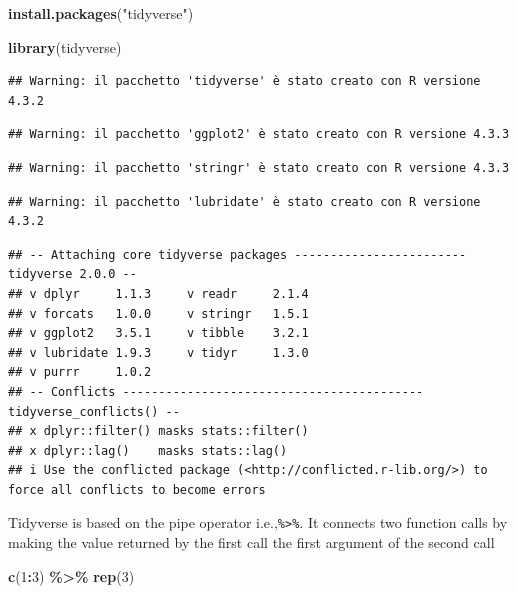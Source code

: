 \documentclass[
]{article}
\newenvironment{Shaded}{\begin{snugshade}}{\end{snugshade}}
\newcommand{\DecValTok}[1]{\textcolor[rgb]{0.00,0.00,0.81}{#1}}
\newcommand{\FunctionTok}[1]{\textcolor[rgb]{0.13,0.29,0.53}{\textbf{#1}}}
\newcommand{\NormalTok}[1]{#1}
\newcommand{\SpecialCharTok}[1]{\textcolor[rgb]{0.81,0.36,0.00}{\textbf{#1}}}
\newcommand{\StringTok}[1]{\textcolor[rgb]{0.31,0.60,0.02}{#1}}
\begin{document}
\begin{Shaded}
\begin{Highlighting}[]
\FunctionTok{install.packages}\NormalTok{(}\StringTok{"tidyverse"}\NormalTok{)}
\end{Highlighting}
\end{Shaded}

\begin{Shaded}
\begin{Highlighting}[]
\FunctionTok{library}\NormalTok{(tidyverse)}
\end{Highlighting}
\end{Shaded}

\begin{verbatim}
## Warning: il pacchetto 'tidyverse' è stato creato con R versione 4.3.2
\end{verbatim}

\begin{verbatim}
## Warning: il pacchetto 'ggplot2' è stato creato con R versione 4.3.3
\end{verbatim}

\begin{verbatim}
## Warning: il pacchetto 'stringr' è stato creato con R versione 4.3.3
\end{verbatim}

\begin{verbatim}
## Warning: il pacchetto 'lubridate' è stato creato con R versione 4.3.2
\end{verbatim}

\begin{verbatim}
## -- Attaching core tidyverse packages ------------------------ tidyverse 2.0.0 --
## v dplyr     1.1.3     v readr     2.1.4
## v forcats   1.0.0     v stringr   1.5.1
## v ggplot2   3.5.1     v tibble    3.2.1
## v lubridate 1.9.3     v tidyr     1.3.0
## v purrr     1.0.2     
## -- Conflicts ------------------------------------------ tidyverse_conflicts() --
## x dplyr::filter() masks stats::filter()
## x dplyr::lag()    masks stats::lag()
## i Use the conflicted package (<http://conflicted.r-lib.org/>) to force all conflicts to become errors
\end{verbatim}

Tidyverse is based on the pipe operator
i.e.,\texttt{\%\textgreater{}\%}. It connects two function calls by
making the value returned by the first call the first argument of the
second call

\begin{Shaded}
\begin{Highlighting}[]
\FunctionTok{c}\NormalTok{(}\DecValTok{1}\SpecialCharTok{:}\DecValTok{3}\NormalTok{) }\SpecialCharTok{\%\textgreater{}\%} \FunctionTok{rep}\NormalTok{(}\DecValTok{3}\NormalTok{) }
\end{Highlighting}
\end{Shaded}
\end{document}
